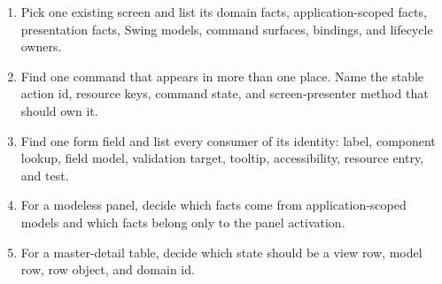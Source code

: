 \begin{exercisebox}
\begin{enumerate}
\item Pick one existing screen and list its domain facts, application-scoped facts, presentation facts, Swing models, command surfaces, bindings, and lifecycle owners.
\item Find one command that appears in more than one place. Name the stable action id, resource keys, command state, and screen-presenter method that should own it.
\item Find one form field and list every consumer of its identity: label, component lookup, field model, validation target, tooltip, accessibility, resource entry, and test.
\item For a modeless panel, decide which facts come from application-scoped models and which facts belong only to the panel activation.
\item For a master-detail table, decide which state should be a view row, model row, row object, and domain id.
\end{enumerate}
\end{exercisebox}
